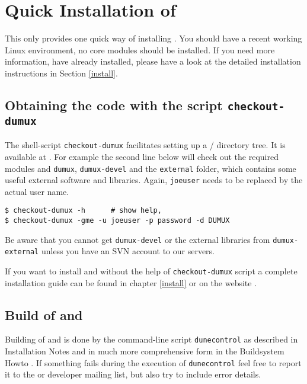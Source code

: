 \section{Quick Installation of \Dumux} \label{quick-install}

This only provides one quick way of installing \Dumux. 
You should have a recent working Linux environment, no \Dune core modules should be installed. 
If you need more information, 
have \Dune already installed, please have a look at the detailed installation 
instructions in Section \ref{install}. 

\subsection{Obtaining the code with the script \texttt{checkout-dumux}}

The shell-script \texttt{checkout-dumux} facilitates setting up a {\Dune}/{\Dumux} directory tree.
It is available at \cite{DUMUX-DOWNLOAD}.
For example the second line below will check out the required \Dune modules and \texttt{dumux}, 
\texttt{dumux-devel} and the \texttt{external} folder, which contains some useful external software and libraries.
Again,  \texttt{joeuser} needs to be replaced by the actual user name.
\begin{lstlisting}[style=Bash]
$ checkout-dumux -h      # show help,
$ checkout-dumux -gme -u joeuser -p password -d DUMUX 
\end{lstlisting}

Be aware that you cannot get \texttt{dumux-devel} or the external libraries from \texttt{dumux-external} unless
you have an SVN account to our servers.

If you want to install \Dune and \Dumux without the help of \texttt{checkout-dumux} script a complete installation
guide can be found in chapter \ref{install} or on the \Dune website \cite{DUNE-INST}.

\subsection{Build of \Dune and \Dumux}
\label{buildIt}
Building of \Dune and \Dumux is done by the command-line script \texttt{dunecontrol} as described in \Dune Installation Notes \cite{DUNE-INST}
and in much more comprehensive form in the \Dune Buildsystem Howto \cite{DUNE-BS}.
If something fails during the execution of \texttt{dunecontrol} feel free to report it to the \Dune or \Dumux developer mailing list,
but also try to include error details.

